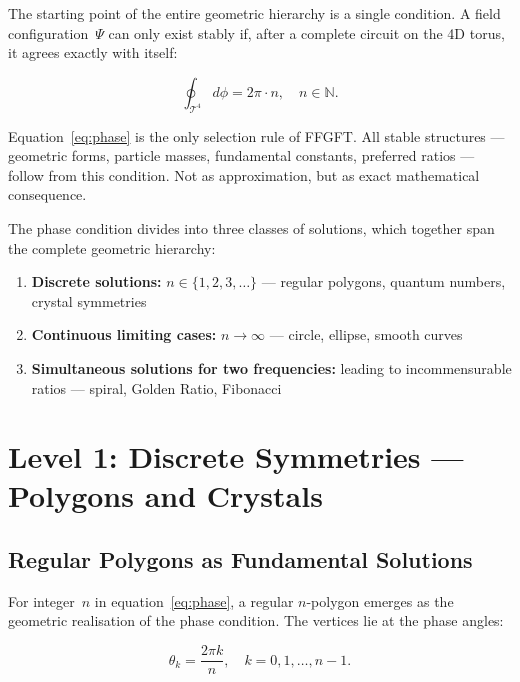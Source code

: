 The starting point of the entire geometric hierarchy is a single
condition. A field configuration~$\Psi$ can only exist stably if,
after a complete circuit on the 4D torus, it agrees exactly with
itself:

\begin{equation}
  \oint_{\mathcal{T}^4} d\phi = 2\pi \cdot n, \quad n \in \mathbb{N}.
  \label{eq:phase}
\end{equation}

\begin{keybox}
Equation~\eqref{eq:phase} is the only selection rule of FFGFT.
All stable structures — geometric forms, particle masses,
fundamental constants, preferred ratios — follow from this condition.
Not as approximation, but as exact mathematical consequence.
\end{keybox}

The phase condition divides into three classes of solutions, which
together span the complete geometric hierarchy:

\begin{enumerate}
  \item \textbf{Discrete solutions:} $n \in \{1, 2, 3, \ldots\}$ — regular
    polygons, quantum numbers, crystal symmetries
  \item \textbf{Continuous limiting cases:} $n \to \infty$ —
    circle, ellipse, smooth curves
  \item \textbf{Simultaneous solutions for two frequencies:} leading to
    incommensurable ratios — spiral, Golden Ratio, Fibonacci
\end{enumerate}

\section{Level 1: Discrete Symmetries — Polygons and Crystals}

\subsection{Regular Polygons as Fundamental Solutions}

For integer~$n$ in equation~\eqref{eq:phase}, a regular $n$-polygon
emerges as the geometric realisation of the phase condition.
The vertices lie at the phase angles:

\begin{equation}
  \theta_k = \frac{2\pi k}{n}, \quad k = 0, 1, \ldots, n-1.
\end{equation}

